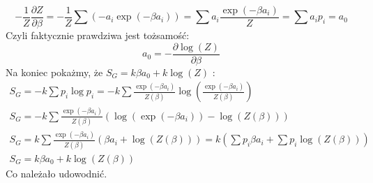 \documentclass[12pt,a4paper]{article}
\begin{document}
$$
-\frac{1}{Z} \frac{\partial Z}{\partial \beta}=-\frac{1}{Z} \sum\left(-a_{i} \exp \left(-\beta a_{i}\right)\right)=\sum a_{i} \frac{\exp \left(-\beta a_{i}\right)}{Z}=\sum a_{i} p_{i}=a_{0}
$$
Czyli faktycznie prawdziwa jest tożsamość:
$$
a_{0}=-\frac{\partial \log (Z)}{\partial \beta}
$$
Na koniec pokażmy, że $S_{G}=k \beta a_{0}+k \log (Z)$ :
$$
\begin{gathered}
S_{G}=-k \sum p_{i} \log p_{i}=-k \sum \frac{\exp \left(-\beta a_{i}\right)}{Z(\beta)} \log \left(\frac{\exp \left(-\beta a_{i}\right)}{Z(\beta)}\right) \\
S_{G}=-k \sum \frac{\exp \left(-\beta a_{i}\right)}{Z(\beta)}\left(\log \left(\exp \left(-\beta a_{i}\right)\right)-\log (Z(\beta))\right) \\
S_{G}=k \sum \frac{\exp \left(-\beta a_{i}\right)}{Z(\beta)}\left(\beta a_{i}+\log (Z(\beta))\right)=k\left(\sum p_{i} \beta a_{i}+\sum p_{i} \log (Z(\beta))\right) \\
S_{G}=k \beta a_{0}+k \log (Z(\beta))
\end{gathered}
$$
Co należało udowodnić.
\end{document}
